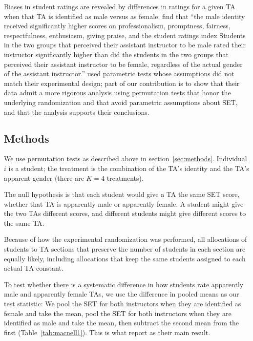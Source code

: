 \documentclass[12pt]{article}
\begin{document}
Biases in student ratings are revealed by differences in ratings for a given TA when that 
TA is identified as male versus as female.
\citet{MacNell2014} find that ``the male identity received significantly higher scores on professionalism, promptness, fairness, respectfulness, enthusiasm, giving praise, and the
student ratings index \textellipsis Students in the two groups that perceived their assistant
instructor to be male rated their instructor significantly higher than did the students in the
two groups that perceived their assistant instructor to be female, regardless of the actual gender
of the assistant instructor.'' 
\citet{MacNell2014} used parametric tests whose assumptions did not match their experimental
design; part of our contribution is to show that their data admit a more rigorous analysis
using permutation tests that honor the underlying randomization and that avoid parametric
assumptions about SET, and that the analysis supports their conclusions.

\subsection{Methods}\label{macnell:methods}
We use permutation tests as described above in section~\ref{sec:methods}.
Individual $i$ is a student; the treatment is the combination of the TA's identity and the TA's
apparent gender (there are $K=4$ treatments).

The null hypothesis is that each student would give a TA the same SET score,
whether that TA is apparently male or apparently female.
A student might give the two TAs different scores,
and different students might give different scores to the same TA. 

Because of how the experimental randomization was performed, all allocations of students to 
TA sections that preserve the number of students in each section are equally likely,  
including allocations that keep the same students assigned to each actual TA constant.

To test whether there is a systematic difference in how students rate apparently male and 
apparently female TAs, we use the difference in pooled means as our test statistic:
We pool the SET for both instructors when they are identified as female
and take the mean, pool the SET for both instructors when they are identified as male
and take the mean, then subtract the second mean from the first (Table~\ref{tab:macnell1}).
This is what \cite{MacNell2014} report as their main result.
\end{document}
